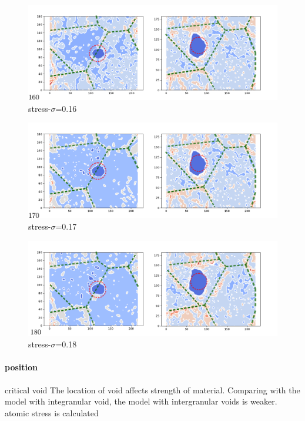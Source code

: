 \documentclass[journal,article,submit,moreauthors,pdftex,10pt,a4paper]{Definitions/mdpi}
\begin{document}
	\begin{figure}[h]
		\centering
		\includegraphics[width=0.7\linewidth]{img/frame160}
		\caption{stress-$\sigma$=0.16}
		\label{ }
	\end{figure}
	
	\begin{figure}[h]
		\centering
		\includegraphics[width=0.7\linewidth]{img/frame170}
		\caption{stress-$\sigma$=0.17}
		\label{ }
	\end{figure}
	
	
	\begin{figure}[h]
		\centering
		\includegraphics[width=0.7\linewidth]{img/frame180}
		\caption{stress-$\sigma$=0.18}
		\label{ }
	\end{figure}
	\paragraph{position}critical void 
The location of void affects strength of material. Comparing with the model with integranular void, the model with intergranular voids is weaker. atomic stress is calculated 
	
	
	
	
	
	
\end{document}
